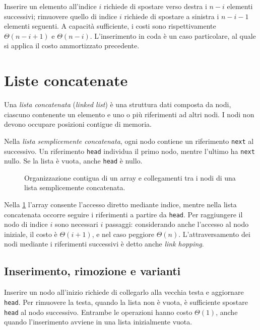 Inserire un elemento all'indice \(i\) richiede di spostare verso
destra i \(n-i\) elementi successivi; rimuovere quello di indice
\(i\) richiede di spostare a sinistra i \(n-i-1\) elementi seguenti.
A capacità sufficiente, i costi sono rispettivamente
\(\Theta(n-i+1)\) e \(\Theta(n-i)\). L'inserimento in coda
è un caso particolare, al quale si applica il costo ammortizzato
precedente.

\section{Liste concatenate}
\label{sec:fi-liste-concatenate}

\begin{definition}
\label{def:fi-lista-concatenata}
Una \emph{lista concatenata} (\emph{linked list}) è una struttura
dati composta da nodi, ciascuno contenente un elemento e uno o
più riferimenti ad altri nodi. I nodi non devono occupare
posizioni contigue di memoria.
\end{definition}

Nella \emph{lista semplicemente concatenata}, ogni nodo contiene
un riferimento \texttt{next} al successivo. Un riferimento
\texttt{head} individua il primo nodo, mentre l'ultimo ha
\texttt{next} nullo. Se la lista è vuota, anche \texttt{head}
è nullo.

\begin{figure}[htbp]
  \centering
  
  \caption{Organizzazione contigua di un array e collegamenti tra
  i nodi di una lista semplicemente concatenata.}
  \label{fig:fi-array-lista-concatenata}
\end{figure}

Nella \cref{fig:fi-array-lista-concatenata} l'array consente
l'accesso diretto mediante indice, mentre nella lista concatenata
occorre seguire i riferimenti a partire da \texttt{head}.
Per raggiungere il nodo di indice \(i\) sono necessari \(i\)
passaggi: considerando anche l'accesso al nodo iniziale, il costo
è \(\Theta(i+1)\), e nel caso peggiore \(\Theta(n)\).
L'attraversamento dei nodi mediante i riferimenti successivi è
detto anche \emph{link hopping}.

\subsection{Inserimento, rimozione e varianti}
\label{sec:fi-liste-concatenate-operazioni}

Inserire un nodo all'inizio richiede di collegarlo alla vecchia
testa e aggiornare \texttt{head}. Per rimuovere la testa,
quando la lista non è vuota, è sufficiente spostare \texttt{head}
al nodo successivo. Entrambe le operazioni hanno costo
\(\Theta(1)\), anche quando l'inserimento avviene in una lista
inizialmente vuota.


